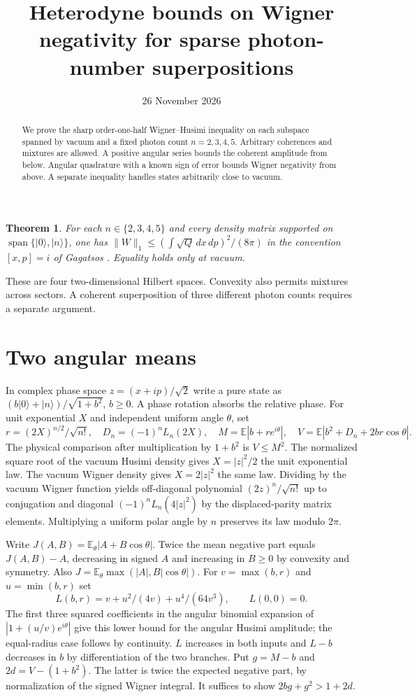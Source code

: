 \documentclass[11pt]{article}
\title{Heterodyne bounds on Wigner negativity for sparse photon-number superpositions}
\date{26 November 2026}
\newtheorem{theorem}{Theorem}
\begin{document}
\maketitle
\begin{abstract}
We prove the sharp order-one-half Wigner--Husimi inequality on each subspace spanned by vacuum and a fixed photon count $n=2,3,4,5$. Arbitrary coherences and mixtures are allowed. A positive angular series bounds the coherent amplitude from below. Angular quadrature with a known sign of error bounds Wigner negativity from above. A separate inequality handles states arbitrarily close to vacuum.
\end{abstract}
\begin{theorem}
For each $n\in\{2,3,4,5\}$ and every density matrix supported on $\operatorname{span}\{|0\rangle,|n\rangle\}$, one has $\|W\|_1\le(\int\sqrt Q\,dx\,dp)^2/(8\pi)$ in the convention $[x,p]=i$ of Gagatsos \cite{gag}. Equality holds only at vacuum.
\end{theorem}
These are four two-dimensional Hilbert spaces. Convexity also permits mixtures across sectors. A coherent superposition of three different photon counts requires a separate argument.

\section{Two angular means}
In complex phase space $z=(x+ip)/\sqrt2$ write a pure state as $(b|0\rangle+|n\rangle)/\sqrt{1+b^2}$, $b\ge0$. A phase rotation absorbs the relative phase. For unit exponential $X$ and independent uniform angle $\theta$, set
\[
 r=(2X)^{n/2}/\sqrt{n!},\quad D_n=(-1)^nL_n(2X),\quad
 M=\mathbb E|b+r e^{i\theta}|,\quad V=\mathbb E|b^2+D_n+2br\cos\theta|.
\]
The physical comparison after multiplication by $1+b^2$ is $V\le M^2$. The normalized square root of the vacuum Husimi density gives $X=|z|^2/2$ the unit exponential law. The vacuum Wigner density gives $X=2|z|^2$ the same law. Dividing by the vacuum Wigner function yields off-diagonal polynomial $(2z)^n/\sqrt{n!}$ up to conjugation and diagonal $(-1)^nL_n(4|z|^2)$ by the displaced-parity matrix elements. Multiplying a uniform polar angle by $n$ preserves its law modulo $2\pi$.

Write $J(A,B)=\mathbb E_\theta|A+B\cos\theta|$. Twice the mean negative part equals $J(A,B)-A$, decreasing in signed $A$ and increasing in $B\ge0$ by convexity and symmetry. Also $J=\mathbb E_\theta\max(|A|,B|\cos\theta|)$. For $v=\max(b,r)$ and $u=\min(b,r)$ set
\[
 L(b,r)=v+u^2/(4v)+u^4/(64v^3),\qquad L(0,0)=0 .
\]
The first three squared coefficients in the angular binomial expansion of $|1+(u/v)e^{i\theta}|$ give this lower bound for the angular Husimi amplitude; the equal-radius case follows by continuity. $L$ increases in both inputs and $L-b$ decreases in $b$ by differentiation of the two branches. Put $g=M-b$ and $2d=V-(1+b^2)$. The latter is twice the expected negative part, by normalization of the signed Wigner integral. It suffices to show $2bg+g^2>1+2d$.
\end{document}
